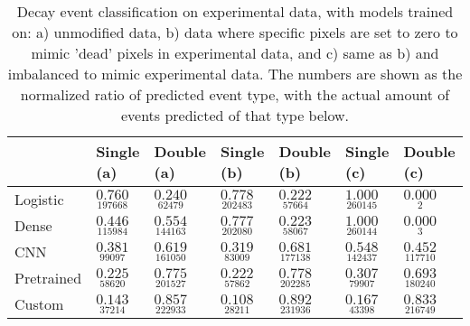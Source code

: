 \begin{table}
\centering
\caption{
Decay event classification on experimental data, with models trained on:
a) unmodified data, b) data where specific pixels are set to zero to mimic
'dead' pixels in experimental data, and c) same as b) and imbalanced to mimic experimental data.
The numbers are shown as the normalized ratio of predicted event type, with the actual amount of
events predicted of that type below.
}
\label{tab:classification-experimental-ratios}
\begin{tabular}{lllllll}
\toprule
{} &                                     Single (a) &                                     Double (a) &                                     Single (b) &                                     Double (b) &                                     Single (c) &                                     Double (c) \\
\midrule
Logistic   &  $\underset{\num{ 197668 }  }{\num{ 0.760 } }$ &  $\underset{\num{ 62479 }  }{\num{ 0.240 } }$ &  $\underset{\num{ 202483 }  }{\num{ 0.778 } }$ &  $\underset{\num{ 57664 }  }{\num{ 0.222 } }$ &  $\underset{\num{ 260145 }  }{\num{ 1.000 } }$ &  $\underset{\num{ 2 }  }{\num{ 0.000 } }$ \\
Dense      &  $\underset{\num{ 115984 }  }{\num{ 0.446 } }$ &  $\underset{\num{ 144163 }  }{\num{ 0.554 } }$ &  $\underset{\num{ 202080 }  }{\num{ 0.777 } }$ &  $\underset{\num{ 58067 }  }{\num{ 0.223 } }$ &  $\underset{\num{ 260144 }  }{\num{ 1.000 } }$ &  $\underset{\num{ 3 }  }{\num{ 0.000 } }$ \\
CNN        &  $\underset{\num{ 99097 }  }{\num{ 0.381 } }$ &  $\underset{\num{ 161050 }  }{\num{ 0.619 } }$ &  $\underset{\num{ 83009 }  }{\num{ 0.319 } }$ &  $\underset{\num{ 177138 }  }{\num{ 0.681 } }$ &  $\underset{\num{ 142437 }  }{\num{ 0.548 } }$ &  $\underset{\num{ 117710 }  }{\num{ 0.452 } }$ \\
Pretrained &  $\underset{\num{ 58620 }  }{\num{ 0.225 } }$ &  $\underset{\num{ 201527 }  }{\num{ 0.775 } }$ &  $\underset{\num{ 57862 }  }{\num{ 0.222 } }$ &  $\underset{\num{ 202285 }  }{\num{ 0.778 } }$ &  $\underset{\num{ 79907 }  }{\num{ 0.307 } }$ &  $\underset{\num{ 180240 }  }{\num{ 0.693 } }$ \\
Custom     &  $\underset{\num{ 37214 }  }{\num{ 0.143 } }$ &  $\underset{\num{ 222933 }  }{\num{ 0.857 } }$ &  $\underset{\num{ 28211 }  }{\num{ 0.108 } }$ &  $\underset{\num{ 231936 }  }{\num{ 0.892 } }$ &  $\underset{\num{ 43398 }  }{\num{ 0.167 } }$ &  $\underset{\num{ 216749 }  }{\num{ 0.833 } }$ \\
\bottomrule
\end{tabular}
\end{table}
